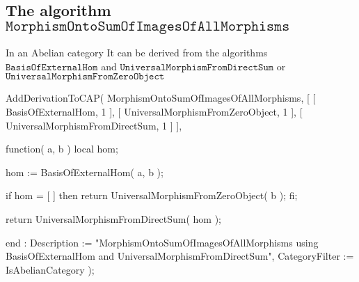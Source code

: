 

\subsection{The algorithm $\mathtt{MorphismOntoSumOfImagesOfAllMorphisms}$}
In an Abelian category 
{It can be derived from the algorithms
$\mathtt{BasisOfExternalHom}$ and $\mathtt{UniversalMorphismFromDirectSum}$ or $\mathtt{UniversalMorphismFromZeroObject}$}

AddDerivationToCAP( MorphismOntoSumOfImagesOfAllMorphisms,
        [ [ BasisOfExternalHom, 1 ],
          [ UniversalMorphismFromZeroObject, 1 ],
          [ UniversalMorphismFromDirectSum, 1 ]
          ],
        
  function( a, b )
    local hom;
    
    hom := BasisOfExternalHom( a, b );
    
    if hom = [ ] then
        return UniversalMorphismFromZeroObject( b );
    fi;
    
    return UniversalMorphismFromDirectSum( hom );
    
end : Description := "MorphismOntoSumOfImagesOfAllMorphisms using BasisOfExternalHom and UniversalMorphismFromDirectSum",
      CategoryFilter := IsAbelianCategory );
















